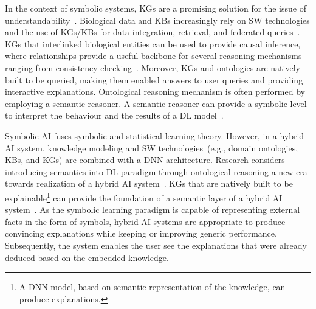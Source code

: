 
\hspace*{3.5mm} In the context of symbolic systems, KGs are a promising solution for the issue of understandability~\cite{futia2020integration}. Biological data and KBs increasingly rely on SW technologies and the use of KGs/KBs for data integration, retrieval, and federated queries~\cite{alshahrani2017neuro}. KGs that interlinked biological entities can be used to provide causal inference, where relationships provide a useful backbone for several reasoning mechanisms ranging from consistency checking~\cite{futia2020integration}. Moreover, KGs and ontologies are natively built to be queried, making them enabled answers to user queries and providing interactive explanations. Ontological reasoning mechanism is often performed by employing a semantic reasoner. A semantic reasoner can provide a symbolic level to interpret the behaviour and the results of a DL model~\cite{futia2020integration}. 

\hspace*{3.5mm} Symbolic AI fuses symbolic and statistical learning theory. However, in a hybrid AI system, knowledge modeling and SW technologies~(e.g., domain ontologies, KBs, and KGs) are combined with a DNN architecture. Research considers introducing semantics into DL paradigm through ontological reasoning a new era towards realization of a hybrid AI system~\cite{futia2020integration}. KGs that are natively built to be explainable\footnote{A DNN model, based on semantic representation of the knowledge, can produce explanations.} can provide the foundation of a semantic layer of a hybrid AI system~\cite{alirezaie2019semantic}. As the symbolic learning paradigm is capable of representing external facts in the form of symbols, hybrid AI systems are appropriate to produce convincing explanations while keeping or improving generic performance. Subsequently, the system enables the user see the explanations that were already deduced based on the embedded knowledge. 

